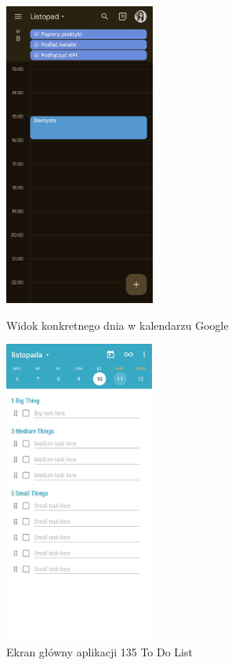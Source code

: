 \begin{figure}
	\begin{minipage}{0.4\textwidth}
		\centering
		\includegraphics[height=10cm, keepaspectratio]{images/analiza/googleCalendar}
		\caption{Widok konkretnego dnia w kalendarzu Google}
		\label{fig:googleCalendar}
	\end{minipage}
	\hfill
	\begin{minipage}{0.4\textwidth}
		\centering
		\includegraphics[height=10cm, keepaspectratio]{images/analiza/135ToDoList}
		\caption{Ekran główny aplikacji 135 To Do List}
		\label{fig:ToDoList}
	\end{minipage}
\end{figure}

